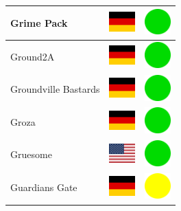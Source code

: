 \documentclass[12pt, a4paper, twoside]{report}
\begin{document}
\begin{center}
\begin{longtable}{|p{5cm}|p{2cm}|p{2cm}|}
 Grime Pack                                                 & \includegraphics[width=1cm]{../img/flags/de} &   \includegraphics[width=1cm]{../likes/y} \\ \hline
 Ground2A                                                   & \includegraphics[width=1cm]{../img/flags/de} &   \includegraphics[width=1cm]{../likes/y} \\ \hline
 Groundville Bastards                                       & \includegraphics[width=1cm]{../img/flags/de} &   \includegraphics[width=1cm]{../likes/y} \\ \hline
 Groza                                                      & \includegraphics[width=1cm]{../img/flags/de} &   \includegraphics[width=1cm]{../likes/y} \\ \hline
 Gruesome                                                   & \includegraphics[width=1cm]{../img/flags/us} &   \includegraphics[width=1cm]{../likes/y} \\ \hline
 Guardians Gate                                             & \includegraphics[width=1cm]{../img/flags/de} &   \includegraphics[width=1cm]{../likes/m} \\ \hline

\end{longtable}
\end{center}
\end{document}

